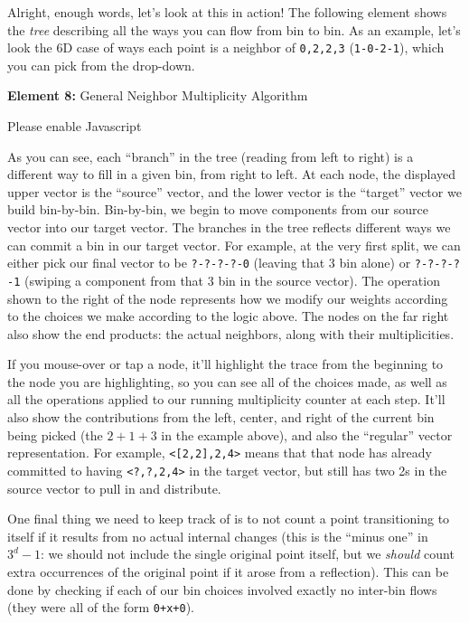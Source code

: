 \documentclass[]{article}
\begin{document}
Alright, enough words, let's look at this in action! The following element shows
the \emph{tree} describing all the ways you can flow from bin to bin. As an
example, let's look the 6D case of ways each point is a neighbor of
\texttt{0,2,2,3} (\texttt{1-0-2-1}), which you can pick from the drop-down.

\leavevmode\hypertarget{golTree}{}%
\textbf{Element 8:} General Neighbor Multiplicity Algorithm

\leavevmode\hypertarget{golTreeCont}{}%
Please enable Javascript

As you can see, each ``branch'' in the tree (reading from left to right) is a
different way to fill in a given bin, from right to left. At each node, the
displayed upper vector is the ``source'' vector, and the lower vector is the
``target'' vector we build bin-by-bin. Bin-by-bin, we begin to move components
from our source vector into our target vector. The branches in the tree reflects
different ways we can commit a bin in our target vector. For example, at the
very first split, we can either pick our final vector to be \texttt{?-?-?-?-0}
(leaving that 3 bin alone) or \texttt{?-?-?-?-1} (swiping a component from that
3 bin in the source vector). The operation shown to the right of the node
represents how we modify our weights according to the choices we make according
to the logic above. The nodes on the far right also show the end products: the
actual neighbors, along with their multiplicities.

If you mouse-over or tap a node, it'll highlight the trace from the beginning to
the node you are highlighting, so you can see all of the choices made, as well
as all the operations applied to our running multiplicity counter at each step.
It'll also show the contributions from the left, center, and right of the
current bin being picked (the \(2+1+3\) in the example above), and also the
``regular'' vector representation. For example,
\texttt{\textless{}{[}2,2{]},2,4\textgreater{}} means that that node has already
committed to having \texttt{\textless{}?,?,2,4\textgreater{}} in the target
vector, but still has two 2s in the source vector to pull in and distribute.

One final thing we need to keep track of is to not count a point transitioning
to itself if it results from no actual internal changes (this is the ``minus
one'' in \(3^d-1\): we should not include the single original point itself, but
we \emph{should} count extra occurrences of the original point if it arose from
a reflection). This can be done by checking if each of our bin choices involved
exactly no inter-bin flows (they were all of the form \texttt{0+x+0}).
\end{document}

